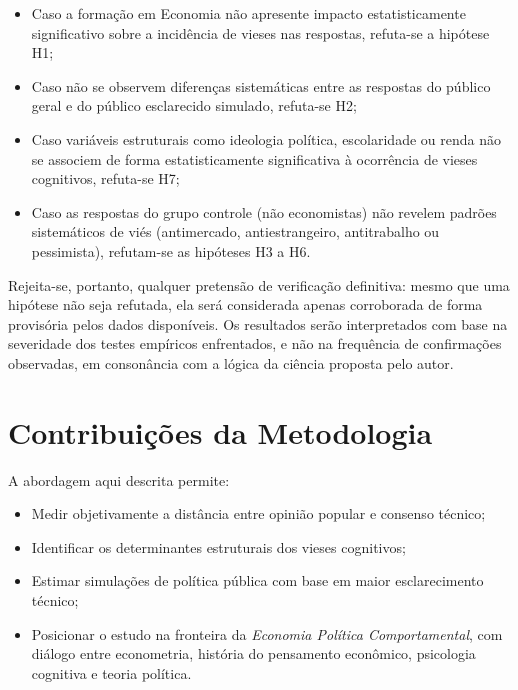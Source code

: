 \begin{itemize}
    \item Caso a formação em Economia não apresente impacto estatisticamente significativo sobre a incidência de vieses nas respostas, refuta-se a hipótese H1;
    \item Caso não se observem diferenças sistemáticas entre as respostas do público geral e do público esclarecido simulado, refuta-se H2;
    \item Caso variáveis estruturais como ideologia política, escolaridade ou renda não se associem de forma estatisticamente significativa à ocorrência de vieses cognitivos, refuta-se H7;
    \item Caso as respostas do grupo controle (não economistas) não revelem padrões sistemáticos de viés (antimercado, antiestrangeiro, antitrabalho ou pessimista), refutam-se as hipóteses H3 a H6.
\end{itemize}

Rejeita-se, portanto, qualquer pretensão de verificação definitiva: mesmo que uma hipótese não seja refutada, ela será considerada apenas corroborada de forma provisória pelos dados disponíveis. Os resultados serão interpretados com base na severidade dos testes empíricos enfrentados, e não na frequência de confirmações observadas, em consonância com a lógica da ciência proposta pelo autor.


\section{Contribuições da Metodologia}

A abordagem aqui descrita permite:
\begin{itemize}
    \item Medir objetivamente a distância entre opinião popular e consenso técnico;
    \item Identificar os determinantes estruturais dos vieses cognitivos;
    \item Estimar simulações de política pública com base em maior esclarecimento técnico;
    \item Posicionar o estudo na fronteira da \textit{Economia Política Comportamental}, com diálogo entre econometria, história do pensamento econômico, psicologia cognitiva e teoria política.
\end{itemize}